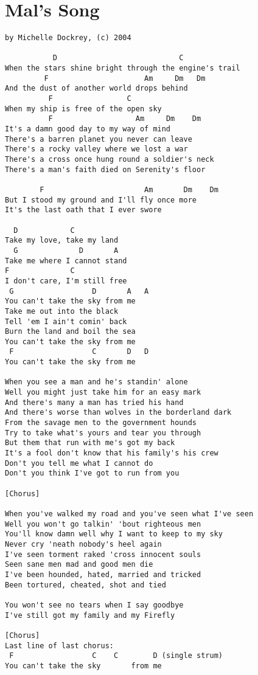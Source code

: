\documentclass[leqno]{memoir}
\begin{document}
\chapter{Mal's Song}
\begin{verbatim}
by Michelle Dockrey, (c) 2004

           D                            C
When the stars shine bright through the engine's trail
         F                      Am     Dm   Dm
And the dust of another world drops behind
          F                 C
When my ship is free of the open sky
          F                   Am     Dm    Dm
It's a damn good day to my way of mind
There's a barren planet you never can leave
There's a rocky valley where we lost a war
There's a cross once hung round a soldier's neck
There's a man's faith died on Serenity's floor

        F                       Am       Dm    Dm
But I stood my ground and I'll fly once more
It's the last oath that I ever swore

  D            C
Take my love, take my land
  G              D       A
Take me where I cannot stand
F              C
I don't care, I'm still free
 G                  D       A   A
You can't take the sky from me
Take me out into the black
Tell 'em I ain't comin' back
Burn the land and boil the sea
You can't take the sky from me
 F                  C       D   D
You can't take the sky from me

When you see a man and he's standin' alone
Well you might just take him for an easy mark
And there's many a man has tried his hand
And there's worse than wolves in the borderland dark
From the savage men to the government hounds
Try to take what's yours and tear you through
But them that run with me's got my back
It's a fool don't know that his family's his crew
Don't you tell me what I cannot do
Don't you think I've got to run from you

[Chorus]

When you've walked my road and you've seen what I've seen
Well you won't go talkin' 'bout righteous men
You'll know damn well why I want to keep to my sky
Never cry 'neath nobody's heel again
I've seen torment raked 'cross innocent souls
Seen sane men mad and good men die
I've been hounded, hated, married and tricked
Been tortured, cheated, shot and tied

You won't see no tears when I say goodbye
I've still got my family and my Firefly

[Chorus]
Last line of last chorus:
 F                  C    C        D (single strum) 
You can't take the sky       from me
\end{verbatim}
\newpage
\end{document}
